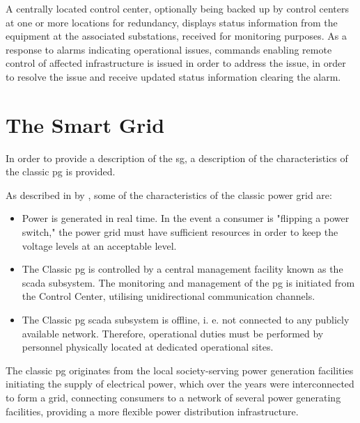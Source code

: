 

A centrally located control center, optionally being backed up by control centers at one or more locations for redundancy, displays status information from the equipment at the associated substations, received for monitoring purposes. As a response to alarms indicating operational issues, commands enabling remote control of affected infrastructure is issued in order to address the issue, in order to resolve the issue and receive updated status information clearing the alarm. 









\section{The Smart Grid}




In order to provide a description of the \acrfull{sg}, a description of the characteristics of the classic \acrshort{pg} is provided.





As described in  \cite{BlumeStevenW2007Epsb} by \citeauthor{BlumeStevenW2007Epsb}, some of the characteristics of the classic power grid are:

\begin{itemize}
\item Power is generated in real time. In the event a consumer is "flipping a power switch," the power grid must have sufficient resources in order to keep the voltage levels at an acceptable level.
\item The Classic \acrlong{pg} is controlled by a central management facility known as the \acrfull{scada} subsystem. The monitoring and management of the \acrshort{pg} is initiated from the Control Center, utilising unidirectional communication channels. 
\item The Classic \acrlong{pg} \acrlong{scada} subsystem is offline, i. e. not connected to any publicly available network. Therefore, operational duties must be performed by personnel physically located at dedicated operational sites.

\end{itemize}

The classic \acrlong{pg} originates from the local society-serving power generation facilities initiating the supply of electrical power, which over the years were interconnected to form a grid, connecting consumers to a network of several power generating facilities, providing a more flexible power distribution infrastructure. 


